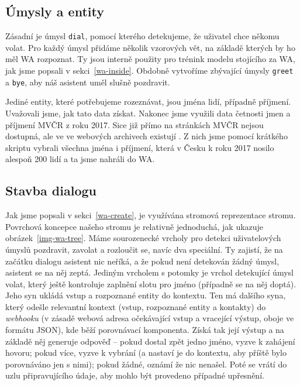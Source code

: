 \subsection{Úmysly a entity}\label{intents-entities}

Zásadní je úmysl
\texttt{dial}, pomocí kterého detekujeme, že uživatel chce někomu volat. Pro
každý úmysl přidáme několik vzorových vět, na základě kterých by ho měl WA
rozpoznat. Ty jsou interně použity pro trénink modelu stojícího za WA, jak
jsme popsali v sekci~\ref{wa-inside}.
Obdobně vytvoříme zbývající úmysly \texttt{greet} a \texttt{bye}, aby náš
asistent uměl slušně pozdravit.

Jediné entity, které potřebujeme rozeznávat, jsou jména lidí, případně příjmení.
Uvažovali jsme, jak tato
data získat. Nakonec jsme využili data četnosti jmen a příjmení MVČR z roku 2017.
Sice již přímo na stránkách MVČR nejsou dostupná, ale ve ve webových archivech
existují \citep{mvcr_cetnost_2018}. Z nich jsme pomocí krátkého skriptu vybrali
všechna jména i příjmení, která v Česku k roku 2017 nosilo alespoň
200 lidí a ta jsme nahráli do WA.

\subsection{Stavba dialogu}\label{building-dialog}

Jak jsme popsali v sekci~\ref{wa-create}, je využívána stromová reprezentace stromu.
Povrchová koncepce našeho stromu je relativně jednoduchá, jak ukazuje obrázek~\ref{img-wa-tree}.
Máme sourozenecké
vrcholy pro detekci uživatelových úmyslů pozdravit, zavolat a rozloučit se, navíc
dva speciální. Ty zajistí, že na začátku dialogu asistent nic neříká, a že
pokud není detekován žádný úmysl, asistent se na něj zeptá. Jediným vrcholem
s potomky je vrchol detekující úmysl volat, který ještě kontroluje zaplnění slotu
pro jméno (případně se na něj doptá). Jeho syn ukládá vstup a rozpoznané entity
do kontextu. Ten
má dalšího syna, který odešle relevantní kontext (vstup, rozpoznané entity a kontakty)
do \textit{webhooku} (v zásadě webová adresa očekávající vstup a vracející
výstup, oboje ve formátu JSON), kde běží porovnávací komponenta. Získá tak její
výstup a na základě něj generuje odpověď -- pokud dostal zpět jedno jméno,
vyzve k zahájení hovoru; pokud více, vyzve k vybrání (a nastaví je do kontextu,
aby příště bylo porovnáváno jen s nimi); pokud žádné, oznámí že nic nenašel.
Poté se vrátí do uzlu připravujícího údaje, aby mohlo být provedeno případné
upřesnění.

